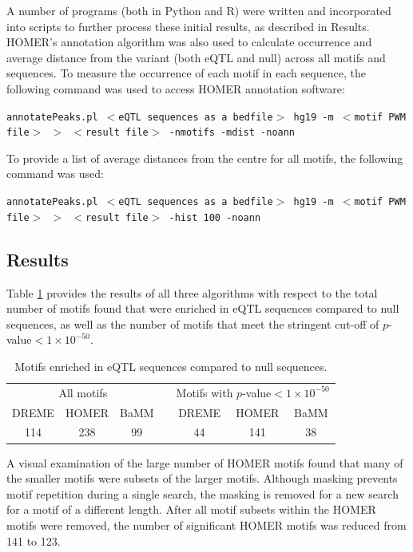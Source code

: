 \documentclass[12pt]{article}
\begin{document}
A number of programs (both in Python and R) were written and incorporated into scripts to further process these initial results, as described in Results. HOMER's annotation algorithm was also used to calculate occurrence and average distance from the variant (both eQTL and null) across all motifs and sequences. To measure the occurrence of each motif in each sequence, the following command was used to access HOMER annotation software:

\texttt{annotatePeaks.pl $<$eQTL sequences as a bedfile$>$ hg19 -m $<$motif PWM file$>$ $>$ $<$result file$>$ -nmotifs -mdist -noann}

To provide a list of average distances from the centre for all motifs, the following command was used:

\texttt{annotatePeaks.pl $<$eQTL sequences as a bedfile$>$ hg19 -m $<$motif PWM file$>$ $>$ $<$result file$>$ -hist 100 -noann}


\subsection{Results}

Table \ref{eQTLmotifNumbers} provides the results of all three algorithms with respect to the total number of motifs found that were enriched in eQTL sequences compared to null sequences, as well as the number of motifs that meet the stringent cut-off of $p$-value$<1\times10^{-50}$.



\begin{table}[!htbp]
\caption{Motifs enriched in eQTL sequences compared to null sequences.}
\label{eQTLmotifNumbers}
\centering
\begin{tabular}{ccccccc}
\toprule[0.2em]
\multicolumn{3}{c}{All motifs} & & \multicolumn{3}{c}{Motifs with $p$-value$<1\times10^{-50}$}\\
\cmidrule[0.1em]{1-3}
\cmidrule[0.1em]{5-7}
DREME & HOMER & BaMM && DREME & HOMER & BaMM\\
114 & 238 & 99 && 44 & 141 & 38\\
\bottomrule[0.2em]
\end{tabular}
\end{table}

A visual examination of the large number of HOMER motifs found that many of the smaller motifs were subsets of the larger motifs. Although masking prevents motif repetition during a single search, the masking is removed for a new search for a motif of a different length. After all motif subsets within the HOMER motifs were removed, the number of significant HOMER motifs was reduced from 141 to 123.
\end{document}
